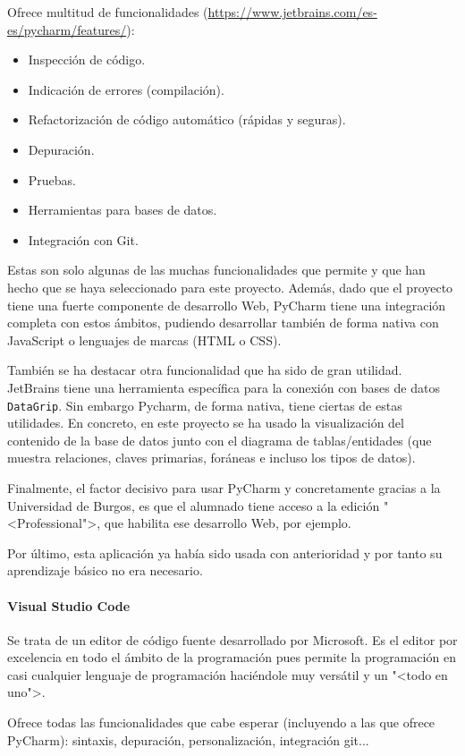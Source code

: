 Ofrece multitud de funcionalidades
(\url{https://www.jetbrains.com/es-es/pycharm/features/}):
\begin{itemize}
	\item Inspección de código.
	\item Indicación de errores (compilación).
	\item Refactorización de código automático (rápidas y seguras).
	\item Depuración.
	\item Pruebas.
	\item Herramientas para bases de datos.
	\item Integración con Git.
\end{itemize}

Estas son solo algunas de las muchas funcionalidades que permite y que han hecho
que se haya seleccionado para este proyecto. Además, dado que el proyecto tiene
una fuerte componente de desarrollo Web, PyCharm tiene una integración completa
con estos ámbitos, pudiendo desarrollar también de forma nativa con JavaScript o
lenguajes de marcas (HTML o CSS).

También se ha destacar otra funcionalidad que ha sido de gran utilidad.
JetBrains tiene una herramienta específica para la conexión con bases de datos
\texttt{DataGrip}. Sin embargo Pycharm, de forma nativa, tiene ciertas de estas
utilidades. En concreto, en este proyecto se ha usado la visualización del
contenido de la base de datos junto con el diagrama de tablas/entidades (que
muestra relaciones, claves primarias, foráneas e incluso los tipos de datos).

Finalmente, el factor decisivo para usar PyCharm y concretamente gracias a la
Universidad de Burgos, es que el alumnado tiene acceso a la edición
"<Professional">, que habilita ese desarrollo Web, por ejemplo.

Por último, esta aplicación ya había sido usada con anterioridad y por tanto su
aprendizaje básico no era necesario.

\paragraph{Visual Studio Code}
Se trata de un editor de código fuente desarrollado por Microsoft. Es el editor
por excelencia en todo el ámbito de la programación pues permite la programación
en casi cualquier lenguaje de programación haciéndole muy versátil y un "<todo
en uno">.

Ofrece todas las funcionalidades que cabe esperar (incluyendo a las que ofrece
PyCharm): sintaxis, depuración, personalización, integración git...

